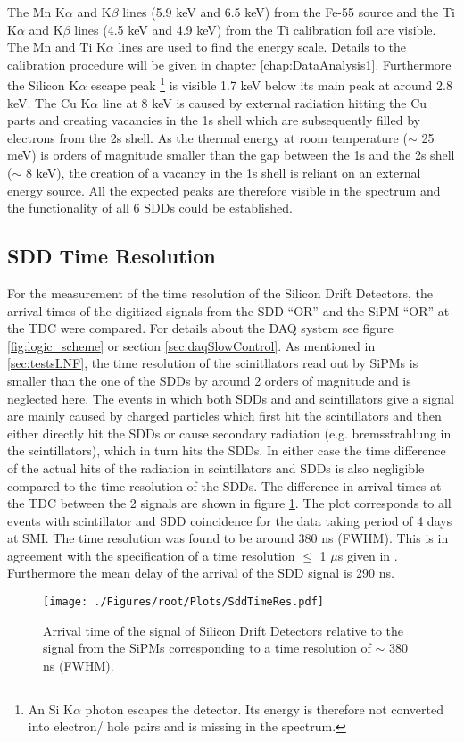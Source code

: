 The Mn K$\alpha$ and K$\beta$ lines (5.9 keV and 6.5 keV) from the Fe-55 source and the Ti K$\alpha$ and K$\beta$ lines (4.5 keV and 4.9 keV) from the Ti calibration foil are visible. The Mn and Ti K$\alpha$ lines are used to find the energy scale. Details to the calibration procedure will be given in chapter \ref{chap:DataAnalysis1}. Furthermore the Silicon K$\alpha$ escape peak \footnote{An Si K$\alpha$ photon escapes the detector. Its energy is therefore not converted into electron/ hole pairs and is missing in the spectrum. } is visible 1.7 keV below its main peak at around 2.8 keV. The Cu K$\alpha$ line at 8 keV is caused by external radiation hitting the Cu parts and creating vacancies in the 1s shell which are subsequently filled by electrons from the 2s shell. As the thermal energy at room temperature ($\sim$ 25 meV) is orders of magnitude smaller than the gap between the 1s and the 2s shell ($\sim$ 8 keV), the creation of a vacancy in the 1s shell is reliant on an external energy source. All the expected peaks are therefore visible in the spectrum and the functionality of all 6 SDDs could be established.

\subsection{SDD Time Resolution}

For the measurement of the time resolution of the Silicon Drift Detectors, the arrival times of the digitized signals from the SDD ``OR'' and the SiPM ``OR'' at the TDC were compared. For details about the DAQ system see figure \ref{fig:logic_scheme} or section \ref{sec:daqSlowControl}. As mentioned in \ref{sec:testsLNF}, the time resolution of the scinitllators read out by SiPMs is smaller than the one of the SDDs by around 2 orders of magnitude and is neglected here. The events in which both SDDs and and scintillators give a signal are mainly caused by charged particles which first hit the scintillators and then either directly hit the SDDs or cause secondary radiation (e.g. bremsstrahlung in the scintillators), which in turn hits the SDDs. In either case the time difference of the actual hits of the radiation in scintillators and SDDs is also negligible compared to the time resolution of the SDDs. The difference in arrival times at the TDC between the 2 signals are shown in figure \ref{fig:sddTimeRes}. The plot corresponds to all events with scintillator and SDD coincidence for the data taking period of 4 days at SMI. The time resolution was found to be around 380 ns (FWHM). This is in agreement with the specification of a time resolution $\leq$ 1 $\mu$s given in \cite{Lechner}. Furthermore the mean delay of the arrival of the SDD signal is 290 ns.
\begin{figure}[h]
 \centering
 \texttt{[image: ./Figures/root/Plots/SddTimeRes.pdf]}
 \caption{Arrival time of the signal of Silicon Drift Detectors relative to the signal from the SiPMs corresponding to a time resolution of $\sim$ 380 ns (FWHM).}
 \label{fig:sddTimeRes}
\end{figure}


